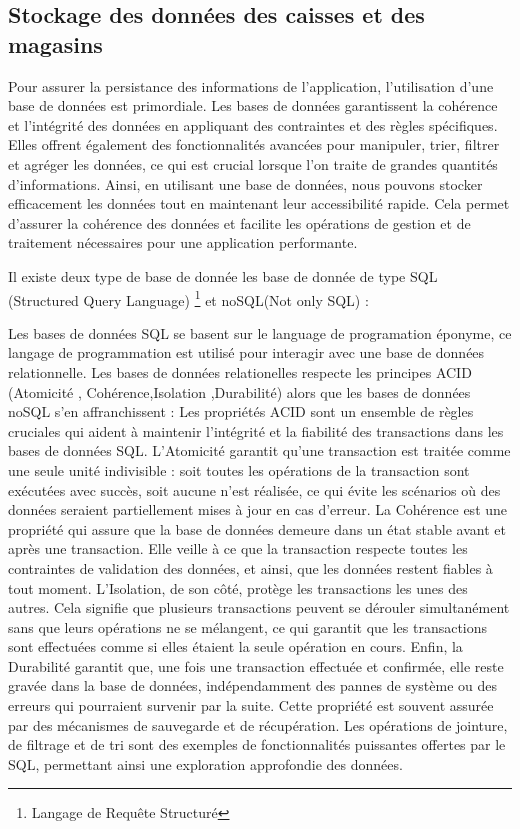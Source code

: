\documentclass[12pt]{article}
\begin{document}
\subsection{Stockage des données des caisses et des magasins }
\justify
\text Pour assurer la persistance des informations de l'application, l'utilisation d'une base de données est primordiale. Les bases de données garantissent la cohérence et l'intégrité des données en appliquant des contraintes et des règles spécifiques. Elles offrent également des fonctionnalités avancées pour manipuler, trier, filtrer et agréger les données, ce qui est crucial lorsque l'on traite de grandes quantités d'informations. Ainsi, en utilisant une base de données, nous pouvons stocker efficacement les données tout en maintenant leur accessibilité rapide. Cela permet d'assurer la cohérence des données et facilite les opérations de gestion et de traitement nécessaires pour une application performante.



\justify
\text Il existe deux type de base de donnée les base de donnée de type SQL (Structured Query Language) \footnote{Langage de Requête Structuré} et noSQL(Not only SQL) :

\justify
\text Les bases de données SQL se basent sur le language de programation éponyme, ce langage de programmation est utilisé pour interagir avec une base de données relationnelle. Les bases de données relationelles respecte les principes ACID (Atomicité , Cohérence,Isolation ,Durabilité) alors que les bases de données noSQL s'en affranchissent  : 
\newline Les propriétés ACID sont un ensemble de règles cruciales qui aident à maintenir l'intégrité et la fiabilité des transactions dans les bases de données SQL. L'Atomicité garantit qu'une transaction est traitée comme une seule unité indivisible : soit toutes les opérations de la transaction sont exécutées avec succès, soit aucune n’est réalisée, ce qui évite les scénarios où des données seraient partiellement mises à jour en cas d'erreur. La Cohérence est une propriété qui assure que la base de données demeure dans un état stable avant et après une transaction. Elle veille à ce que la transaction respecte toutes les contraintes de validation des données, et ainsi, que les données restent fiables à tout moment. L'Isolation, de son côté, protège les transactions les unes des autres. Cela signifie que plusieurs transactions peuvent se dérouler simultanément sans que leurs opérations ne se mélangent, ce qui garantit que les transactions sont effectuées comme si elles étaient la seule opération en cours. Enfin, la Durabilité garantit que, une fois une transaction effectuée et confirmée, elle reste gravée dans la base de données, indépendamment des pannes de système ou des erreurs qui pourraient survenir par la suite. Cette propriété est souvent assurée par des mécanismes de sauvegarde et de récupération. Les opérations de jointure, de filtrage et de tri sont des exemples de fonctionnalités puissantes offertes par le SQL, permettant ainsi une exploration approfondie des données.
\end{document}

